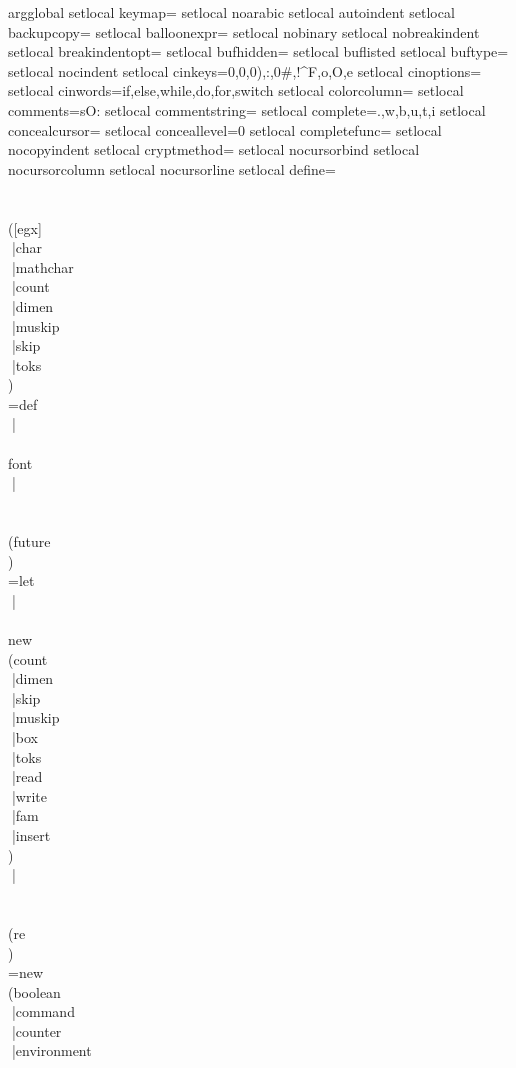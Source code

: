 {{{argglobal
setlocal keymap=
setlocal noarabic
setlocal autoindent
setlocal backupcopy=
setlocal balloonexpr=
setlocal nobinary
setlocal nobreakindent
setlocal breakindentopt=
setlocal bufhidden=
setlocal buflisted
setlocal buftype=
setlocal nocindent
setlocal cinkeys=0{,0},0),:,0#,!^F,o,O,e
setlocal cinoptions=
setlocal cinwords=if,else,while,do,for,switch
setlocal colorcolumn=
setlocal comments=sO:%
setlocal commentstring=%
setlocal complete=.,w,b,u,t,i
setlocal concealcursor=
setlocal conceallevel=0
setlocal completefunc=
setlocal nocopyindent
setlocal cryptmethod=
setlocal nocursorbind
setlocal nocursorcolumn
setlocal nocursorline
setlocal define=\\\\\\([egx]\\|char\\|mathchar\\|count\\|dimen\\|muskip\\|skip\\|toks\\)\\=def\\|\\\\font\\|\\\\\\(future\\)\\=let\\|\\\\new\\(count\\|dimen\\|skip\\|muskip\\|box\\|toks\\|read\\|write\\|fam\\|insert\\)\\|\\\\\\(re\\)\\=new\\(boolean\\|command\\|counter\\|environment\\}}}
